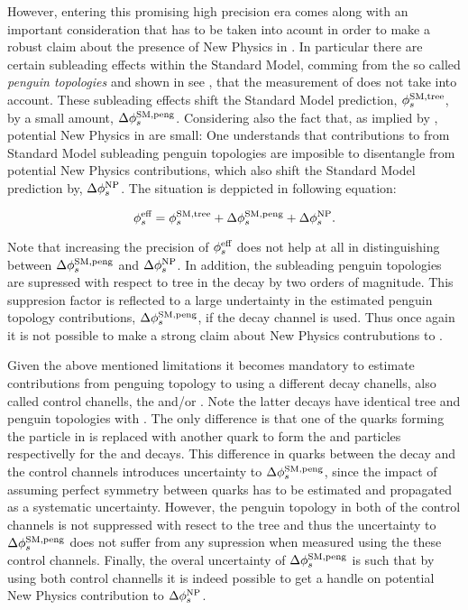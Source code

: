 However, entering this promising high precision era comes along with an important consideration
that has to be taken into acount in order to make a robust claim about the presence of New Physics
in \phis. In particular there are certain subleading effects within the Standard Model, comming from
the so called {\it penguin topologies} and shown in see , that the
\phis measurement of  does not take into account. These subleading effects shift
the Standard Model prediction, $\phi_{s}^{\tiny \text{SM,tree}}$, by a small amount, $\Delta\phi_{s}^{\tiny\text{SM,peng}}$.
Considering also the fact that, as implied by , potential New Physics in
\phis are small: One understands that contributions to \phis from Standard Model subleading penguin
topologies are imposible to disentangle from potential New Physics contributions, which also shift
the Standard Model prediction by, $\Delta\phi_{s}^{\tiny \text{NP}}$. The situation is deppicted in
following equation:

\begin{equation}
\centering
 \phis^{\text {eff}} = \phis^{\tiny \text{SM,tree}} + \Delta\phiS{SM,peng} + \Delta\phis^{\tiny \text{NP}}.
 \label{app_phis_sm_peng}
\end{equation}

\noindent Note that increasing the precision of $\phi_{s}^{\text {eff}}$ does not help at all in distinguishing
between $\Delta\phi_{s}^{\tiny\text{SM,peng}}$ and $\Delta\phi_{s}^{\tiny \text{NP}}$. In addition, the subleading penguin
topologies are supressed with respect to tree in the \BsJpsiPhi decay by two orders of magnitude.
This suppresion factor is reflected to a large undertainty in the estimated penguin topology contributions,
$\Delta\phi_{s}^{\tiny\text{SM,peng}}$, if the \BsJpsiPhi decay channel is used. Thus once again it is not possible to
make a strong claim about New Physics contrubutions to \phis.

Given the above mentioned limitations it becomes mandatory to estimate contributions from
penguing topology to \phis using a different decay chanells, also called control chanells,
\eg the \BsJpsiKst and/or \BdJpsiRho. Note the latter decays have identical tree and penguin
topologies with \BsJpsiPhi. The only difference is that one of the quarks forming the \Pphi
particle in  is replaced with another quark to form the \Kstarz
and \rhoz particles respectivelly for the \BsJpsiKst and \BdJpsiRho decays. This difference in
quarks between the \BsJpsiPhi decay and the control channels introduces uncertainty to
$\Delta\phi_{s}^{\tiny\text{SM,peng}}$, since the impact of assuming perfect symmetry between quarks has to be
estimated and propagated as a systematic uncertainty. However, the penguin topology in both of
the control channels is not suppressed with resect to the tree and thus the uncertainty to
$\Delta\phi_{s}^{\tiny\text{SM,peng}}$ does not suffer from any supression when measured using the
these control channels. Finally, the overal uncertainty of $\Delta\phi_{s}^{\tiny\text{SM,peng}}$ is such
that by using both control channells it is indeed possible to get a handle on potential
New Physics contribution to $\Delta\phi_{s}^{\tiny \text{NP}}$.

